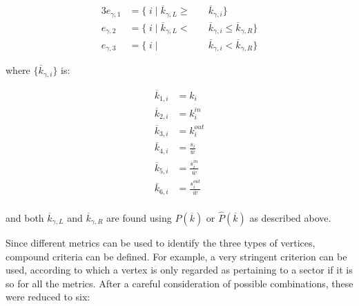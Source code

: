 \documentclass[%
	aip,
	jmp,%
	amsmath,amssymb,
	reprint,%
]{revtex4-1}
\begin{document}
\begin{alignat}{3}\label{eq:part}
	e_{\gamma,1}&=\{\;i\;|\;\overline{k}_{\gamma,L}\geq&&\overline{k}_{\gamma,i}\} \nonumber \\
	e_{\gamma,2}&=\{\;i\;|\;\overline{k}_{\gamma,L}<\;&&\overline{k}_{\gamma,i}\leq\overline{k}_{\gamma,R}\} \\ 
	e_{\gamma,3}&=\{\;i\;|\;&&\overline{k}_{\gamma,i}<\overline{k}_{\gamma,R}\} \nonumber
\end{alignat}

\noindent where $\{\overline{k}_{\gamma,i}\}$ is:

\begin{equation}
	\begin{split}
		\overline{k}_{1,i}&=k_i \\
		\overline{k}_{2,i}&=k_i^{in} \\
		\overline{k}_{3,i}&=k_i^{out} \\
		\overline{k}_{4,i}&=\frac{s_i}{\overline{w}} \\
		\overline{k}_{5,i}&=\frac{s_i^{in}}{\overline{w}} \\
		\overline{k}_{6,i}&=\frac{s_i^{out}}{\overline{w}} \\
	\end{split}
\end{equation}

\noindent and both $\overline{k}_{\gamma,L}$ and $\overline{k}_{\gamma,R}$ are found using $P(\overline{k})$ or $\hat{P}(\overline{k})$ as described above.

Since different metrics can be used to identify the three types of vertices, compound criteria can be defined. For example, a very stringent criterion can be used, according to which a vertex is only regarded as pertaining to a sector if it is so for all the metrics. After a careful consideration of possible combinations, these were reduced to six:
\end{document}
